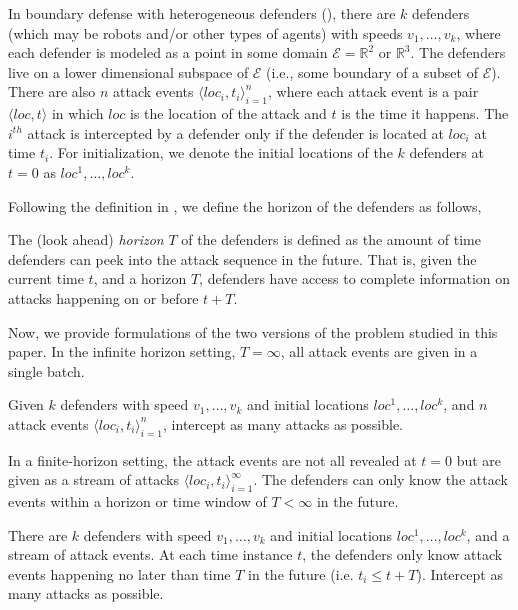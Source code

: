 In boundary defense with heterogeneous defenders (\prob), there are $k$ defenders (which may be robots and/or other types of agents) with speeds $v_1,\dots,v_k$, where each defender is modeled as a point in some domain $\mathcal E = \mathbb R^2$ or $\mathbb R^3$.
The defenders live on a lower dimensional subspace of $\mathcal E$ (i.e., some boundary of a subset of $\mathcal E$).  
There are also $n$ attack events $\big\langle loc_i, t_i\big\rangle_{i=1}^{n}$, where each attack event is a pair $\big\langle loc, t\big\rangle$ in which $loc$ is the
location of the attack and $t$ is the time it happens. 
The $i^{{th}}$ attack is intercepted by a defender only if the defender is located at $loc_i$ at time $t_i$.
For initialization, we denote the initial locations of the $k$ defenders at $t=0$ as $loc^{1},\dots, loc^{k}$. 

Following the definition in \cite{adler2022role}, we define the horizon of the defenders as follows,
\begin{definition}[Horizon]
The (look ahead) \textit{horizon} $T$ of the defenders is defined as the amount of time defenders can peek into the attack sequence in the future. That is, given the current time $t$, and a horizon $T$, defenders have access to complete information on attacks happening on or before $t+T$. 
\end{definition}

Now, we provide formulations of the two versions of the \prob problem studied in this paper. In the infinite horizon setting, $T = \infty$, all attack events are given in a single batch.

\begin{problem}\label{prob:bd-1}
Given $k$ defenders with speed $v_1, \dots, v_k$ and initial locations $loc^1, \ldots, loc^k$, and $n$ attack events $\big\langle loc_i, t_i\big\rangle_{i=1}^{n}$, intercept as many attacks as possible. 
\end{problem}

In a finite-horizon setting, the attack events are not all revealed at $t=0$ but are given as a stream of attacks $\big\langle loc_i, t_i\big\rangle_{i=1}^{\infty}$. The defenders can only know the attack events within a horizon or time window of $T < \infty$ in the future.

\begin{problem}\label{prob:bd-2}
There are $k$ defenders with speed $v_1, \dots, v_k$ and initial locations $loc^1, \ldots, loc^k$, and a stream of attack events.
%
At each time instance $t$, the defenders only know attack events happening no later than time $T$ in the future (i.e. $t_i \le t+T$).
%
Intercept as many attacks as possible. 
\end{problem}

